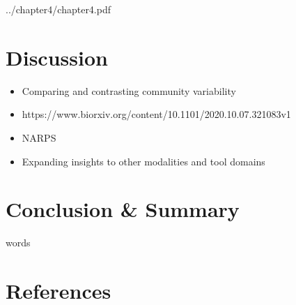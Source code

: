 \documentclass[fleqn,12pt]{SelfArx} %
\newcounter{secnonum}
\begin{document}
{}

            {../chapter4/chapter4.pdf}



\section{Discussion}
\begin{itemize}
\item Comparing and contrasting community variability
\item https://www.biorxiv.org/content/10.1101/2020.10.07.321083v1
\item NARPS
\item Expanding insights to other modalities and tool domains
\end{itemize}

\section{Conclusion \& Summary}
words

\section{References}



\end{document}

